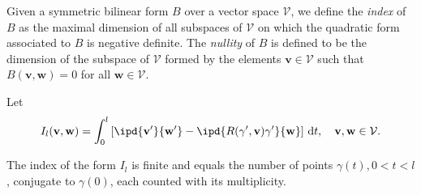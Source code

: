 Given a symmetric bilinear form $B$ over a vector space $\mathcal{V}$, we define the \textit{index} of $B$ as the maximal dimension of all subspaces of $\mathcal{V}$ on which the quadratic form associated to $B$ is negative definite. The  \textit{nullity} of $B$ is defined to be the dimension of the subspace of $\mathcal{V}$ formed by the elements $\mathbf{v}\in \mathcal{V}$ such that $B(\mathbf{v},\mathbf{w})=0$ for all $\mathbf{w}\in \mathcal{V}$.

Let 
 \[
   I_l(\mathbf{v},\mathbf{w})= \int_0^{l}\left[\ipd{\mathbf{v}'}{\mathbf{w}'}-\ipd{R(\gamma',\mathbf{v})\gamma'}{\mathbf{w}}\right]\,\mathrm{d}t,\quad \mathbf{v},\mathbf{w}\in \mathcal{V}.
\] 

\begin{theorem}
  The index of the form $I_l$ is finite and equals the number of points $\gamma(t),0<t<l$, conjugate to $\gamma(0)$, each counted with its multiplicity.
\end{theorem}

